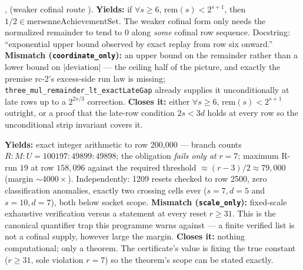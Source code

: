 \begin{obs} 
,
(weaker cofinal route ).
\textbf{Yields:} if $\forall s \ge 6$, $\mathrm{rem}(s) < 2^{s+1}$, then $1/2 \in
\mathrm{mersenneAchievementSet}$. The weaker cofinal form only needs the normalized remainder to
tend to $0$ along \emph{some} cofinal row sequence. Docstring: ``exponential upper bound
observed by exact replay from row six onward.''
\textbf{Mismatch (\texttt{coordinate\_only}):} an upper bound on the remainder rather than a
lower bound on $|\text{deviation}|$ — the ceiling half of the picture, and exactly the premise
rc-2's excess-side run law is missing; \texttt{three\_mul\_remainder\_lt\_exactLateGap} already
supplies it unconditionally at late rows up to a $2^{2s/3}$ correction.
\textbf{Closes it:} either $\forall s\ge6$, $\mathrm{rem}(s) < 2^{s+1}$ outright, or a proof that
the late-row condition $2s<3d$ holds at every row so the unconditional strip invariant covers
it.
\end{obs}

\begin{obs} 
\textbf{Yields:} exact integer arithmetic to row 200{,}000 — branch counts $R\!:\!M\!:\!U =
100197\!:\!49899\!:\!49898$; the obligation \emph{fails only at} $r=7$; maximum R-run $19$ at row
$158{,}096$ against the required threshold $\approx (r-3)/2 \approx 79{,}000$ (margin
$\sim\!4000\times$). Independently: 1209 resets checked to row 2500, zero classification
anomalies, exactly two crossing cells ever ($s{=}7,d{=}5$ and $s{=}10,d{=}7$), both below socket
scope.
\textbf{Mismatch (\texttt{scale\_only}):} fixed-scale exhaustive verification versus a statement
at every reset $r \ge 31$. This is the canonical quantifier trap this programme warns against — a
finite verified list is not a cofinal supply, however large the margin.
\textbf{Closes it:} nothing computational; only a theorem. The certificate's value is fixing the
true constant ($r \ge 31$, sole violation $r=7$) so the theorem's scope can be stated exactly.
\end{obs}

